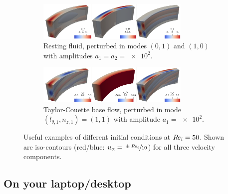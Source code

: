\documentclass[a4paper, 11pt, DIV=11]{scrartcl}
\begin{document}
\begin{figure}
\vfill
\begin{subfigure}{1.0\textwidth}
\centering
\includegraphics[width=0.8\textwidth]{figures/tc0039/icPerturb01and10.png}
\caption{Resting fluid, perturbed in modes $(0,1)$ and  $(1,0)$
with amplitudes $a_{1}=a_{2}=\num{e2}$.}
\label{fig:tc0039icPerturb01and10}
\end{subfigure}
\vfill
\begin{subfigure}{1.0\textwidth}
\centering
\includegraphics[width=0.8\textwidth]{figures/tc0039/icPerturb22.png}
\caption{Taylor-Couette base flow, perturbed in mode
$(l_{\theta,1}, n_{z,1})=(1,1)$ with amplitude $a_{1}=\num{e2}$.}
\label{fig:tc0039icPerturb22}
\end{subfigure}
\caption{Useful examples of different initial conditions at $R\hspace{-0.1em}e_{i}=\num{50}$.
Shown are iso-contours (red/blue: $u_{\alpha}=\sfrac{\pm R\hspace{-0.1em}e_{i}}{10}$) for all
three velocity components.}
\label{fig:ic}
\end{figure}

\subsection{On your laptop/desktop}
\label{sec:onYourLaptopDesktop}
\end{document}
